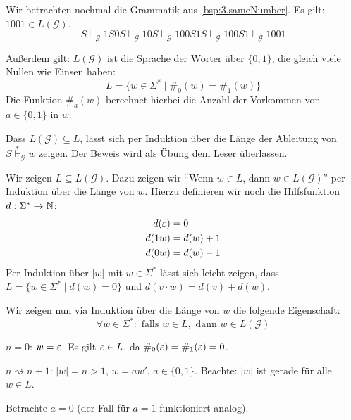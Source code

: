 
\begin{Bsp}Wir betrachten nochmal die Grammatik aus \autoref{bsp:3.sameNumber}.
Es gilt: $1001\in L(\mathcal{G})$.
$$ S 
\vdash_\mathcal{G} 1S0S
\vdash_\mathcal{G} 10S
\vdash_\mathcal{G} 100S1S
\vdash_\mathcal{G} 100S1
\vdash_\mathcal{G} 1001
$$

Außerdem gilt: $L(\mathcal{G})$ ist die Sprache der Wörter über $\{0,1\}$, die gleich viele Nullen wie Einsen haben:
  \begin{displaymath}
    L = \{ w \in \Sigma^* \mid \#_0(w) = \#_1(w)\}
  \end{displaymath}
  Die Funktion $\#_a(w)$ berechnet hierbei die Anzahl der Vorkommen von $a \in \{0, 1\}$ in $w$.

  Dass $L(\mathcal{G}) \subseteq L$, lässt sich per Induktion über die Länge der Ableitung von $S \stackrel{*}{\vdash}_\mathcal{G} w$ zeigen.
  Der Beweis wird als Übung dem Leser überlassen.

  Wir zeigen $L \subseteq L(\mathcal{G})$.
  Dazu zeigen wir "`Wenn $w \in L$, dann $w \in L(\mathcal{G})$"' per Induktion über die Länge von $w$.
  Hierzu definieren wir noch die Hilfsfunktion $d : \Sigma^* \to \mathbb{N}$:
  \begin{align*}
    d(\varepsilon) &= 0 \\
    d(1w) &= d(w) + 1 \\
    d(0w) &= d(w) - 1
  \end{align*}
  Per Induktion über $|w|$ mit $w \in \Sigma^*$ lässt sich leicht zeigen, dass $L = \{w \in \Sigma^* \mid d(w) = 0\}$ und $d(v \cdot w) = d(v) + d(w)$.
  
Wir zeigen nun via Induktion über die Länge von $w$ die folgende Eigenschaft:
$$\forall w \in \Sigma^*: \text{ falls } w \in L, \text{ dann } w \in L(\mathcal{G})$$

\begin{description}[font=\normalfont]
\item[I.A.:] $n = 0$: $w = \varepsilon$. Es gilt $\varepsilon \in L$, da $\#_0(\varepsilon) = \#_1(\varepsilon) = 0$.
\item[I.S.:] $n \rightsquigarrow n+1$: $|w| = n > 1$, $w = aw'$, $a \in \{0,1\}$.
  Beachte: $|w|$ ist gerade für alle $w \in L$.

  Betrachte $a = 0$ (der Fall für $a = 1$ funktioniert analog).


\end{description}
\end{Bsp}
